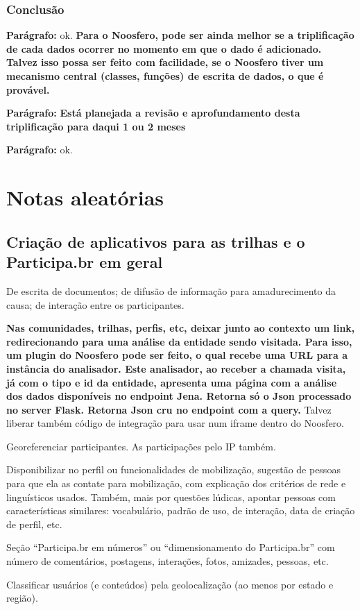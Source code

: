 \documentclass[12pt]{report}
\newcommand{\p}[0]{

\textbf{Parágrafo:}
}
\newcommand{\VV}[1]{{\bf \color{red} #1}}
\begin{document}
\section{Conclusão}
\p ok. \VV{Para o Noosfero, pode ser ainda melhor se a triplificação de cada dados ocorrer no momento em que o dado é adicionado. Talvez isso possa ser feito com facilidade, se o Noosfero tiver um mecanismo central (classes, funções) de escrita de dados, o que é provável.}
\p \VV{Está planejada a revisão e aprofundamento desta triplificação para daqui 1 ou 2 meses}
\p ok.


\part{Notas aleatórias}

\chapter{Criação de aplicativos para as trilhas e o Participa.br em geral}
De escrita de documentos; de difusão de informação para amadurecimento da causa; de interação entre os participantes.

{\bf Nas comunidades, trilhas, perfis, etc, deixar junto ao contexto um link, redirecionando para uma análise da entidade sendo visitada. Para isso, um plugin do Noosfero pode ser feito, o qual recebe uma URL para a instância do analisador. Este analisador, ao receber a chamada visita, já com o tipo e id da entidade, apresenta uma página com a análise dos dados disponíveis no endpoint Jena. Retorna só o Json processado no server Flask. Retorna Json cru no endpoint com a query.} Talvez liberar também código de integração para usar num iframe dentro do Noosfero.

Georeferenciar participantes. As participações pelo IP também.

Disponibilizar no perfil ou funcionalidades de mobilização, sugestão de pessoas para que ela as contate para mobilização, com explicação dos critérios de rede e linguísticos usados. Também, mais por questões lúdicas, apontar pessoas com características similares: vocabulário, padrão de uso, de interação, data de criação de perfil, etc.

Seção ``Participa.br em números'' ou ``dimensionamento do Participa.br'' com número de comentários, postagens, interações, fotos, amizades, pessoas, etc.

Classificar usuários (e conteúdos) pela geolocalização (ao menos por estado e região).
\end{document}
